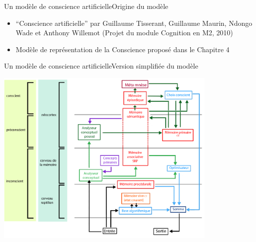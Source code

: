 \begin{frame}{Un modèle de conscience artificielle}{Origine du modèle}
\begin{itemize}
  \item \enquote{Conscience
  artificielle} par Guillaume Tisserant, Guillaume Maurin, Ndongo
  Wade et Anthony Willemot (Projet du module \og Cognition \fg{} en M2, 2010)
  \item Modèle de représentation de la Conscience proposé dans le Chapitre 4
\end{itemize}
\end{frame}

\begin{frame}{Un modèle de conscience artificielle}{Version simplifiée du
modèle}
\begin{center}
\includegraphics[width=0.8\textwidth]{img/intro/modele_original}
\end{center}
\end{frame}

